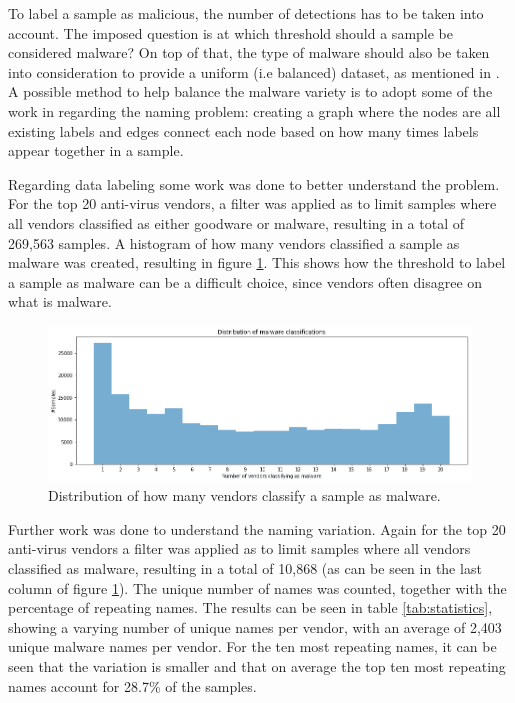 \documentclass{llncs}
\begin{document}
To label a sample as malicious, the number of detections has to be taken into account. The imposed question is at which threshold should a sample be considered malware? On top of that, the type of malware should also be taken into consideration to provide a uniform (i.e balanced) dataset, as mentioned in \cite{rossow:practices}. A possible method to help balance the malware variety is to adopt some of the work in \cite{perdisci:behavior} regarding the naming problem: creating a graph where the nodes are all existing labels and edges connect each node based on how many times labels appear together in a sample.

Regarding data labeling some work was done to better understand the problem. For the top 20 anti-virus vendors, a filter was applied as to limit samples where all vendors classified as either goodware or malware, resulting in a total of 269,563 samples. A histogram of how many vendors classified a sample as malware was created, resulting in figure \ref{fig:dist_mal_class}. This shows how the threshold to label a sample as malware can be a difficult choice, since vendors often disagree on what is malware.

\begin{figure}[]
	\includegraphics[width=\textwidth]{samples_top20_class}
	\caption{Distribution of how many vendors classify a sample as malware.}
	\label{fig:dist_mal_class}
\end{figure}

Further work was done to understand the naming variation. Again for the top 20 anti-virus vendors a filter was applied as to limit samples where all vendors classified as malware, resulting in a total of 10,868 (as can be seen in the last column of figure \ref{fig:dist_mal_class}). The unique number of names was counted, together with the percentage of repeating names. The results can be seen in table \ref{tab:statistics}, showing a varying number of unique names per vendor, with an average of 2,403 unique malware names per vendor. For the ten most repeating names, it can be seen that the variation is smaller and that on average the top ten most repeating names account for 28.7\% of the samples.
\end{document}
